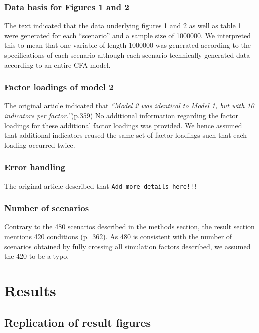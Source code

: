 \documentclass[10,a4paperpaper,]{article}
\begin{document}
\subsubsection{Data basis for Figures 1 and 2}

The text indicated that the data underlying figures 1 and 2 as well as
table 1 were generated for each ``scenario'' and a sample size of
1000000. We interpreted this to mean that one variable of length 1000000
was generated according to the specifications of each scenario although
each scenario technically generated data according to an entire CFA
model.

\subsubsection{Factor loadings of model 2}

The original article indicated that \emph{``Model 2 was identical to
Model 1, but with 10 indicators per factor.''}(p.359) No additional
information regarding the factor loadings for these additional factor
loadings was provided. We hence assumed that additional indicators
reused the same set of factor loadings such that each loading occurred
twice.

\subsubsection{Error handling}

The original article described that \texttt{Add\ more\ details\ here!!!}

\subsubsection{Number of scenarios}

Contrary to the 480 scenarios described in the methods section, the
result section mentions 420 conditions (p.~362). As 480 is consistent
with the number of scenarios obtained by fully crossing all simulation
factors described, we assumed the 420 to be a typo.

\section{Results}

\subsection{Replication of result figures}
\end{document}
